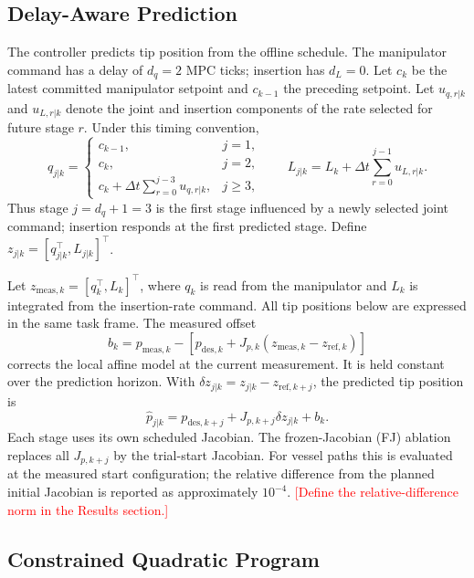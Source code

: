\documentclass[journal]{IEEEtran}
\newcommand{\TBD}[1]{\textcolor{red}{[#1]}}
\begin{document}
\subsection{Delay-Aware Prediction}
\label{sec:pred}

The controller predicts tip position from the offline schedule. The
manipulator command has a delay of $d_q=2$ MPC ticks; insertion has
$d_L=0$. Let $c_k$ be the latest committed manipulator setpoint and
$c_{k-1}$ the preceding setpoint. Let $u_{q,r|k}$ and $u_{L,r|k}$
denote the joint and insertion components of the rate selected for
future stage $r$. Under this timing convention,
\begin{equation}
q_{j|k}=
\begin{cases}
c_{k-1}, & j=1,\\
c_k, & j=2,\\
c_k+\Delta t\displaystyle\sum_{r=0}^{j-3}u_{q,r|k}, & j\geq3,
\end{cases}
\qquad
L_{j|k}=L_k+\Delta t\sum_{r=0}^{j-1}u_{L,r|k}.
\label{eq:delay}
\end{equation}
Thus stage $j=d_q+1=3$ is the first stage influenced by a newly
selected joint command; insertion responds at the first predicted
stage. Define $z_{j|k}=[q_{j|k}^\top,L_{j|k}]^\top$.

Let $z_{\mathrm{meas},k}=[q_k^\top,L_k]^\top$, where $q_k$ is read
from the manipulator and $L_k$ is integrated from the insertion-rate
command. All tip positions below are expressed in the same task frame.
The measured offset
\begin{equation}
b_k=p_{\mathrm{meas},k}-
\left[p_{\mathrm{des},k}
+J_{p,k}(z_{\mathrm{meas},k}-z_{\mathrm{ref},k})\right]
\label{eq:offset}
\end{equation}
corrects the local affine model at the current measurement. It is held
constant over the prediction horizon. With
$\delta z_{j|k}=z_{j|k}-z_{\mathrm{ref},k+j}$, the predicted tip
position is
\begin{equation}
\hat p_{j|k}
=p_{\mathrm{des},k+j}
+J_{p,k+j}\delta z_{j|k}+b_k.
\label{eq:prediction}
\end{equation}
Each stage uses its own scheduled Jacobian. The frozen-Jacobian (FJ)
ablation replaces all $J_{p,k+j}$ by the trial-start Jacobian. For
vessel paths this is evaluated at the measured start configuration;
the relative difference from the planned initial Jacobian is reported
as approximately $10^{-4}$. \TBD{Define the relative-difference norm
in the Results section.}

\subsection{Constrained Quadratic Program}
\label{sec:mpc}
\end{document}
